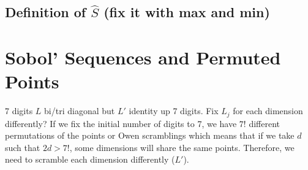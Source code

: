 \documentclass[]{elsarticle}
\theoremstyle{definition}
\begin{document}
\subsection{Definition of $\widehat{S}$ (fix it with max and min)}

\section{Sobol' Sequences and Permuted Points}
7 digits $L$ bi/tri diagonal but $L'$ identity up 7 digits.
Fix $L_j$ for each dimension differently?
If we fix the initial number of digits to 7, we have $7!$ different permutations of the points or Owen scramblings which means that if we take $d$ such that $2d>7!$, some dimensions will share the same points. Therefore, we need to scramble each dimension differently ($L'$).
\end{document}
